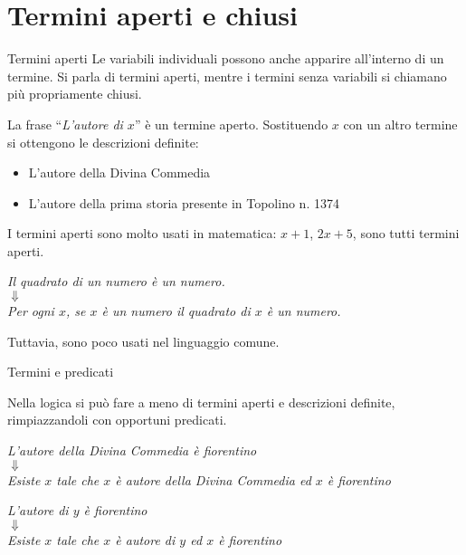 \documentclass[aspectratio=169,10pt,dvipsnames]{beamer}
\begin{document}

\iffalse

\section{Termini aperti e chiusi}

\begin{frame}{Termini aperti}
	Le variabili individuali possono anche apparire all'interno di un termine. Si parla di \alert{termini aperti}, mentre i termini senza variabili si chiamano più propriamente \alert{chiusi}.
	\begin{example}
	La frase ``{\itshape L'autore di $x$}'' è un termine aperto. Sostituendo $x$ con un altro termine si ottengono le descrizioni definite:
	\begin{itemize}
		\itshape
		\item L'autore della Divina Commedia\\
		\item L'autore della prima storia presente in Topolino n. 1374
	\end{itemize}
	\end{example}
    I termini aperti sono molto usati in matematica: $x+1$, $2x+5$, sono tutti termini aperti.
    \begin{example}
        \itshape\centering
        Il quadrato di un numero è un numero.\\
        $\Downarrow$\\
        Per ogni $x$, se $x$ è un numero il quadrato di $x$ è un numero.
    \end{example}
    Tuttavia, sono poco usati nel linguaggio comune.

\end{frame}

\begin{frame}{Termini e predicati}

Nella logica si può fare a meno di termini aperti e descrizioni definite, rimpiazzandoli con opportuni predicati.

\begin{example}
    \itshape\centering
    \alert<2->{L'autore della Divina Commedia} è fiorentino\\
    $\Downarrow$\\
    Esiste $x$ tale che \alert<2->{$x$ è autore della Divina Commedia} ed $x$ è fiorentino
\end{example}

\begin{example}
    \itshape\centering
    \alert<3->{L'autore di $y$} è fiorentino\\
    $\Downarrow$\\
    Esiste $x$ tale che \alert<3->{$x$ è autore di $y$} ed $x$ è fiorentino
\end{example}

\end{frame}
\end{document}
